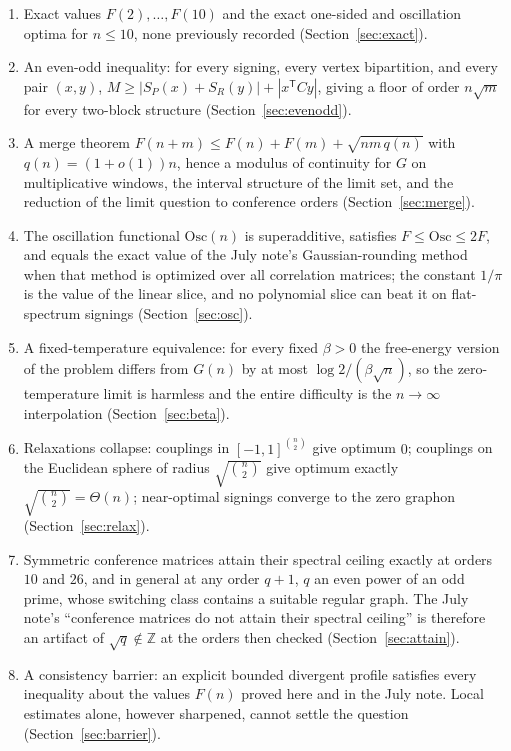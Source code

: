 \documentclass[11pt]{article}
\theoremstyle{remark}
\newcommand{\Osc}{\mathrm{Osc}}
\begin{document}
\begin{enumerate}
\item Exact values $F(2),\dots,F(10)$ and the exact one-sided and
oscillation optima for $n\le10$, none previously recorded
(Section~\ref{sec:exact}).
\item An even-odd inequality: for every signing, every vertex
bipartition, and every pair $(x,y)$,
$M\ge|S_P(x)+S_R(y)|+|x^{\mathsf T}Cy|$, giving a floor of order
$n\sqrt m$ for every two-block structure (Section~\ref{sec:evenodd}).
\item A merge theorem $F(n+m)\le F(n)+F(m)+\sqrt{nm\,q(n)}$ with
$q(n)=(1+o(1))n$, hence a modulus of continuity for $G$ on
multiplicative windows, the interval structure of the limit set, and
the reduction of the limit question to conference orders
(Section~\ref{sec:merge}).
\item The oscillation functional $\Osc(n)$ is superadditive, satisfies
$F\le\Osc\le2F$, and equals the exact value of the July note's
Gaussian-rounding method when that method is optimized over all
correlation matrices; the constant $1/\pi$ is the value of the linear
slice, and no polynomial slice can beat it on flat-spectrum signings
(Section~\ref{sec:osc}).
\item A fixed-temperature equivalence: for every fixed $\beta>0$ the
free-energy version of the problem differs from $G(n)$ by at most
$\log2/(\beta\sqrt n)$, so the zero-temperature limit is harmless and
the entire difficulty is the $n\to\infty$ interpolation
(Section~\ref{sec:beta}).
\item Relaxations collapse: couplings in $[-1,1]^{\binom n2}$ give
optimum $0$; couplings on the Euclidean sphere of radius
$\sqrt{\binom n2}$ give optimum exactly $\sqrt{\binom n2}=\Theta(n)$;
near-optimal signings converge to the zero graphon
(Section~\ref{sec:relax}).
\item Symmetric conference matrices attain their spectral ceiling
exactly at orders $10$ and $26$, and in general at any order $q+1$,
$q$ an even power of an odd prime, whose switching class contains a
suitable regular graph. The July note's ``conference matrices do not
attain their spectral ceiling'' is therefore an artifact of
$\sqrt q\notin\mathbb Z$ at the orders then checked
(Section~\ref{sec:attain}).
\item A consistency barrier: an explicit bounded divergent profile
satisfies every inequality about the values $F(n)$ proved here and in
the July note. Local estimates alone, however sharpened, cannot settle
the question (Section~\ref{sec:barrier}).
\end{enumerate}
\end{document}
